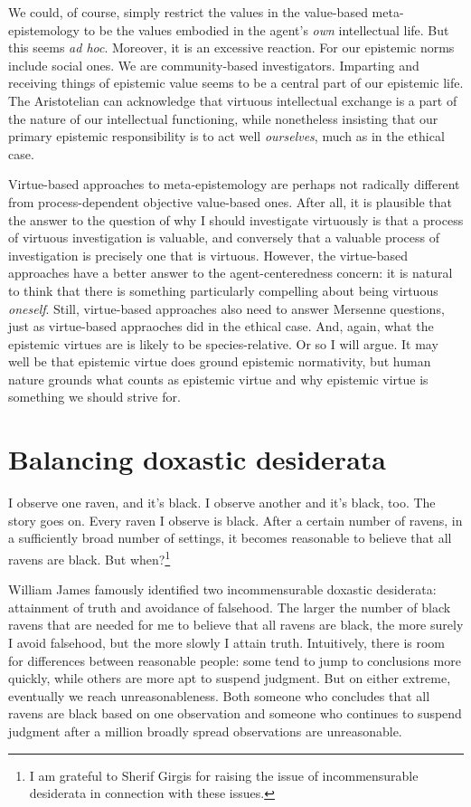 We could, of course, simply restrict the values in the value-based meta-epistemology to be
the values embodied in the agent's \textit{own} intellectual life. But this seems \textit{ad hoc}.
Moreover, it is an excessive reaction. For our epistemic norms include social ones. We are community-based
investigators. Imparting and receiving things of epistemic value seems to be a central part of our
epistemic life. The Aristotelian can acknowledge that virtuous intellectual exchange is a part 
of the nature of our intellectual functioning, while nonetheless insisting that our primary epistemic
responsibility is to act well \textit{ourselves}, much as in the ethical case.

Virtue-based approaches to meta-epistemology are perhaps not radically different from
process-dependent objective value-based ones. After all, it is plausible that the answer to the question of why I should
investigate virtuously is that a process of virtuous investigation is valuable, and conversely
that a valuable process of investigation is precisely one that is virtuous. However, the
virtue-based approaches have a better answer to the agent-centeredness concern: it is natural
to think that there is something particularly compelling about being virtuous \textit{oneself}.
Still, virtue-based  approaches also need to answer Mersenne questions, just as virtue-based
appraoches did in the ethical case. And, again,
what the epistemic virtues are is likely to be species-relative. Or so I will argue. It may well
be that epistemic virtue does ground epistemic normativity, but human nature grounds what counts as
epistemic virtue and why epistemic virtue is something we should strive for.

\section{Balancing doxastic desiderata}
I observe one raven, and it's black. I observe another and it's black, too. The story goes on. Every
raven I observe is black. After a certain number of ravens, in a sufficiently broad number of settings,
it becomes reasonable to believe that all ravens are black. But when?\footnote{I am grateful to Sherif Girgis for raising the issue of incommensurable desiderata in connection with these issues.}

William James famously identified two incommensurable doxastic desiderata: attainment of truth and avoidance of falsehood.
The larger the number of black ravens that are needed for me to believe that all ravens are black, the more surely
I avoid falsehood, but the more slowly I attain truth. Intuitively, there is room for differences between reasonable
people: some tend to jump to conclusions more quickly, while others are more apt to suspend judgment. But on either
extreme, eventually we reach unreasonableness. Both someone who concludes that all ravens are black based on one 
observation and someone who continues to suspend judgment after a million broadly spread observations are unreasonable.

